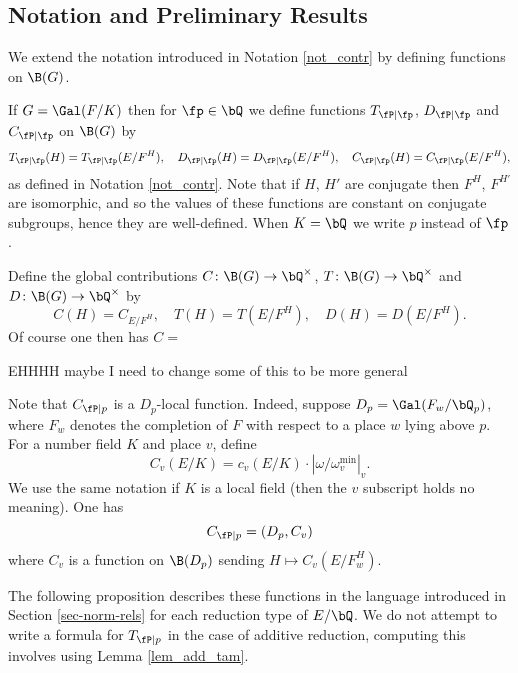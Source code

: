 \subsection{Notation and Preliminary Results}

We extend the notation introduced in Notation \ref{not_contr} by defining functions on $\B(G)$. 

\begin{defn}\label{not_contr_fns}
    If $G = \Gal(F / K)$ then for $\fp \in \bQ$ we define functions $T_{\fP \mid \fp}$, $D_{\fP \mid \fp}$ and $C_{\fP \mid \fp}$ on $\B(G)$ by 
    \[ T_{\fP \mid \fp}(H) = T_{\fP \mid \fp}(E / F^H), \quad D_{\fP \mid \fp}(H) = D_{\fP \mid \fp}(E / F^H), \quad C_{\fP \mid \fp}(H) = C_{\fP \mid \fp}(E / F^H), \]
    as defined in Notation \ref{not_contr}.
    Note that if $H$, $H'$ are conjugate then $F^H$, $F^{H'}$ are isomorphic, and so the values of these functions are constant on conjugate subgroups, hence they are well-defined. When $K = \bQ$ we write $p$ instead of $\fp$. 
    
    Define the global contributions $C \colon \B(G) \to \bQ^{\times}$, $T \colon \B(G) \to \bQ^{\times}$ and $D \colon \B(G) \to \bQ^{\times}$ by 
    \[ C(H) = C_{E / F^H}, \quad T(H) = T(E / F^H), \quad D(H) = D(E / F^H). \] 
    Of course one then has $C = $
\end{defn}
 
{\color{red} EHHHH maybe I need to change some of this to be more general}
\begin{rem}\label{Rem-C-D-loc}
Note that $C_{\fP \mid p}$ is a $D_p$-local function. Indeed, suppose $D_p = \Gal(F_w / \bQ_p)$, where $F_w$ denotes the completion of $F$ with respect to a place $w$ lying above $p$. For a number field $K$ and place $v$, define $$C_v(E / K) = c_v(E / K) \cdot \left| \omega / \omega_v^{\min} \right|_v.$$ We use the same notation if $K$ is a local field (then the $v$ subscript holds no meaning).
One has
\begin{equation*}
    C_{\fP \mid p} = (D_p, C_v)
\end{equation*}
where $C_v$ is a function on $\B(D_p)$ sending $H \mapsto C_v(E / F_w^H)$.
\end{rem}

The following proposition describes these functions in the language introduced in Section \ref{sec-norm-rels} for each reduction type of $E / \bQ$. We do not attempt to write a formula for $T_{\fP \mid p}$ in the case of additive reduction, computing this involves using Lemma \ref{lem_add_tam}.

